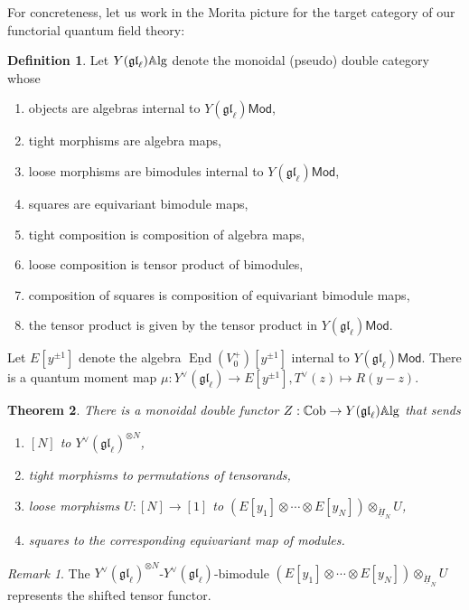 \documentclass[11pt]{report}
\newtheorem{theorem}{Theorem}[section]
\theoremstyle{definition}
\newtheorem{definition}[theorem]{Definition}
\theoremstyle{remark}
\newtheorem*{remark}{Remark}
\theoremstyle{remark}
\begin{document}
For concreteness, let us work in the Morita picture for the target category of our functorial quantum field theory:

\begin{definition}
Let $Y(\mathfrak{gl}_\ell)\mathbb{A}\textnormal{lg}$ denote the monoidal (pseudo) double category whose
\begin{enumerate}[label=(\roman*)]
\item objects are algebras internal to $Y(\mathfrak{gl}_\ell)\mathsf{Mod}$,
\item tight morphisms are algebra maps,
\item loose morphisms are bimodules internal to $Y(\mathfrak{gl}_\ell)\mathsf{Mod}$,
\item squares are equivariant bimodule maps,
\item tight composition is composition of algebra maps,
\item loose composition is tensor product of bimodules,
\item composition of squares is composition of equivariant bimodule maps,
\item the tensor product is given by the tensor product in $Y(\mathfrak{gl}_\ell)\mathsf{Mod}$.
\end{enumerate}
\end{definition}

Let $E[y^{\pm 1}]$ denote the algebra $\underline{\operatorname{End}}(V_0^+)[y^{\pm 1}]$ internal to $Y(\mathfrak{gl}_\ell)\mathsf{Mod}$. There is a quantum moment map $\mu: Y^\vee(\mathfrak{gl}_\ell) \to E[y^{\pm 1}], T^\vee(z) \mapsto R(y-z)$.

\begin{theorem}
There is a monoidal double functor $Z: \mathbb{C}\textnormal{ob} \to Y(\mathfrak{gl}_\ell)\mathbb{A}\textnormal{lg}$ that sends
\begin{enumerate}[label=(\roman*)]
\item $[N]$ to $Y^\vee(\mathfrak{gl}_\ell)^{\otimes N}$,
\item tight morphisms to permutations of tensorands,
\item loose morphisms $U: [N] \to [1]$ to $(E[y_1] \otimes \cdots \otimes E[y_N]) \otimes_{\underline{\dot H}_N} U$,
\item squares to the corresponding equivariant map of modules.
\end{enumerate}
\end{theorem}

\begin{remark}
The $Y^\vee(\mathfrak{gl}_\ell)^{\otimes N}$-$Y^\vee(\mathfrak{gl}_\ell)$-bimodule $(E[y_1] \otimes \cdots \otimes E[y_N]) \otimes_{\underline{\dot H}_N} U$ represents the shifted tensor functor.
\end{remark}
\end{document}
